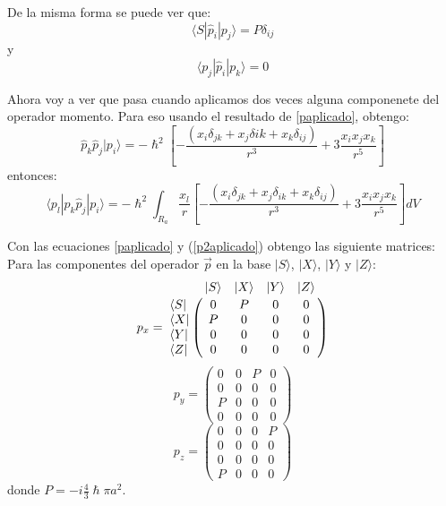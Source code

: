 \documentclass[10pt,a4paper]{article}
\begin{document}
De la misma forma se puede ver que:
\begin{equation}
\langle S|\hat{p}_i|p_j\rangle=P \delta_{ij}
\end{equation}
y
\begin{equation}
\langle p_j|\hat{p}_i|p_k\rangle=0
\end{equation}


Ahora voy a ver que pasa cuando aplicamos dos veces alguna componenete del operador momento. Para eso usando el resultado de 
\ref{paplicado}, obtengo:
\begin{equation}
\hat{p}_k\hat{p}_j|p_i\rangle=-\hslash^2\left[-\frac{(x_i\delta_{jk}+x_j\delta{ik}+x_k\delta_{ij})}{r^3}+3\frac{x_ix_jx_k}{r^5}\right]
\end{equation}
entonces:
\begin{equation}\label{p2aplicado}
\langle p_l|\hat{p}_k\hat{p}_j|p_i\rangle=-\hslash^2\int_{R_a} \frac{x_l}{r}\left[-\frac{(x_i\delta_{jk}+x_j\delta_{ik}+x_k\delta_{ij})}{r^3}+3\frac{x_ix_jx_k}{r^5}\right] dV
\end{equation}

Con las ecuaciones \ref{paplicado} y (\ref{p2aplicado}) obtengo las siguiente matrices:
Para las componentes del operador $\vec{p}$ en la base $|S\rangle$, $|X\rangle$, $|Y\rangle$ y $|Z\rangle$:
\begin{equation}\label{px}
p_x=\bordermatrix{~   &       |S\rangle & |X\rangle & |Y\rangle & |Z\rangle \cr
                  \langle S| & 0        & P         & 0         & 0 \cr
                  \langle X| & P        & 0         & 0         & 0 \cr
                  \langle Y| & 0        & 0         & 0         & 0 \cr
                  \langle Z| & 0        & 0         & 0         & 0 \cr}
\end{equation}
\begin{equation}\label{py}
p_y=\begin{pmatrix}
    0 & 0 & P & 0 \\
    0 & 0 & 0 & 0 \\
    P & 0 & 0 & 0 \\
    0 & 0 & 0 & 0
    \end{pmatrix}
\end{equation}
\begin{equation}\label{pz}
p_z=\begin{pmatrix}
    0 & 0 & 0 & P \\
    0 & 0 & 0 & 0 \\
    0 & 0 & 0 & 0 \\
    P & 0 & 0 & 0
    \end{pmatrix}
\end{equation}
donde $P=-i\frac{4}{3} \hslash \pi a^2$.
\end{document}
